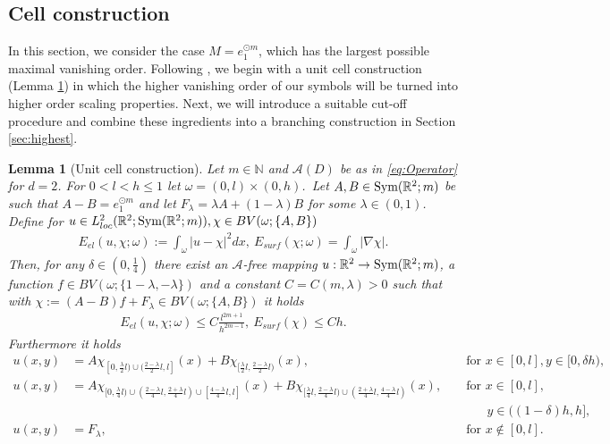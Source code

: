 \documentclass[a4paper, 10pt, twoside, notitlepage]{amsart}
\theoremstyle{plain}
\newtheorem{lem}[prop]{Lemma}
\newcommand{\R}{\mathbb{R}}
\newcommand{\N}{\mathbb{N}}
\newcommand{\A}{\mathcal{A}}
\begin{document}
		
		\subsection{Cell construction}
		\label{sec:cell}
		
		In this section, we consider the case $M = e_1^{\odot m}$, which has the largest possible maximal vanishing order.  Following \cite{CC15}, we begin with a unit cell construction (Lemma \ref{lem:UnitCell}) in which the higher vanishing order
		of our symbols will be turned into higher order scaling properties. Next, we will introduce a suitable cut-off procedure and combine these ingredients into a branching construction in Section
		\ref{sec:highest}.
		
		
		
		
		
		\begin{lem}[Unit cell construction] 
		\label{lem:UnitCell} 
		Let $m \in \N$ and $\A(D)$ be as in \eqref{eq:Operator} for $d = 2$.  For $0 < l < h \leq 1$ let $\omega = (0,l) \times (0,h)$.\ Let
			$A,B \in \textup{Sym}(\R^2;m)$ be such that $A-B = e_1^{\odot m}$ and let $F_\lambda = \lambda A + (1-\lambda) B$ for some $\lambda \in (0,1)$.  Define for
			$u \in L^2_{loc}(\R^2;\textup{Sym}(\R^2;m)), \chi \in BV(\omega;\{A,B\})$
			\begin{align*}
				E_{el}(u,\chi;\omega) := \int_{\omega} |u-\chi|^2 dx, \ E_{surf}(\chi;\omega) = \int_{\omega} |\nabla \chi|.
			\end{align*}
			Then, for any $\delta \in (0,\frac{1}{4})$ there exist an $\A$-free mapping $u: \R^2 \to \textup{Sym}(\R^2;m)$, a function $f \in BV(\omega;\{1-\lambda,-\lambda\})$
			and a constant $C = C(m,\lambda) > 0$ such that with $\chi := (A-B)f + F_\lambda \in BV(\omega;\{A,B\})$ it holds
			\begin{align*}
				E_{el}(u,\chi;\omega) \leq C \frac{l^{2m+1}}{h^{2m-1}}, \ E_{surf}(\chi) \leq C h.
			\end{align*}
			Furthermore it holds
			\begin{align*}
				u(x,y) & = A \chi_{[0,\frac{\lambda}{2}l) \cup (\frac{2-\lambda}{2}l,l]}(x) + B \chi_{[\frac{\lambda}{2}l,\frac{2-\lambda}{2}l)}(x), && \text{ for } x \in [0,l], y \in [0,\delta h), \\
                          u(x,y) & = A \chi_{[0,\frac{\lambda}{4}l) \cup (\frac{2-\lambda}{4}l,\frac{2+\lambda}{4}l) \cup [\frac{4-\lambda}{4}l,l]}(x) + B \chi_{[\frac{\lambda}{4}l,\frac{2-\lambda}{4}l) \cup (\frac{2+\lambda}{4}l,\frac{4-\lambda}{4}l)}(x),&& \text{ for } x \in [0,l],\\
                                       && & \qquad y \in ((1-\delta)h,h], \\
				u(x,y) & = F_\lambda, && \text{ for } x \notin [0,l].
			\end{align*}
		\end{lem}
		
\end{document}
